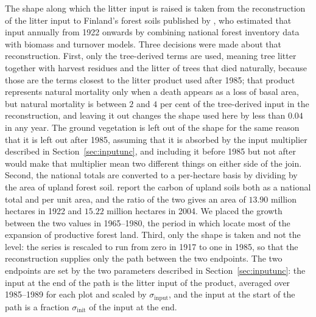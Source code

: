 \documentclass[11pt]{article}
\begin{document}
The shape along which the litter input is raised is taken from the reconstruction of the litter input to Finland's
forest soils published by \citet{Liski2006}, who estimated that input annually from
1922 onwards by combining national forest inventory data with biomass and turnover
models. 
Three decisions were made about that reconstruction.
First, only the tree-derived terms are used, meaning tree litter together with harvest
residues and the litter of trees that died naturally, because those are the terms
closest to the litter product used after 1985; that product represents natural
mortality only when a death appears as a loss of basal area, but natural mortality is
between $2$ and $4$ per cent of the tree-derived input in the reconstruction, and
leaving it out changes the shape used here by less than $0.04$ in any year. The ground vegetation is left out of the shape for the
same reason that it is left out after 1985, assuming that it is absorbed by the input
multiplier described in Section~\ref{sec:inputunc}, and including it before 1985 but not after would make that
multiplier mean two different things on either side of the join. 
Second, the national totals are converted to a per-hectare basis by dividing by the
area of upland forest soil. \citet{Liski2006} report the carbon of upland soils both
as a national total and per unit area, and the ratio of the two gives an area of
$13.90$ million hectares in 1922 and $15.22$ million hectares in 2004. We placed the
growth between the two values in 1965--1980, the period in which \citet{Korhonen2024}
locate most of the expansion of productive forest land.
Third, only the shape is taken and not the level: the series is rescaled to run from
zero in 1917 to one in 1985, so that the reconstruction supplies only the path between
the two endpoints. The two endpoints are set by the two parameters described in Section~\ref{sec:inputunc}: the input at the end of the
path is the litter input of the product, averaged over 1985--1989 for each plot and
scaled by $\sigma_{\mathrm{input}}$, and the input at the start of the path is a
fraction $\sigma_{\mathrm{init}}$ of the input at the end.
\end{document}

